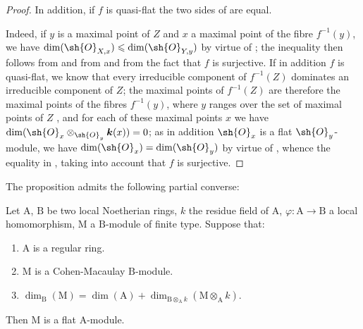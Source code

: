\begin{proof}
In addition, if $f$ is quasi-flat  the two sides of  are equal.

Indeed, if $y$ is a maximal point of $Z$ and $x$ a maximal point of the fibre $f^{-1}(y)$, we have $\dim(\sh{O}_{X,x})\leqslant\dim(\sh{O}_{Y,y})$ by virtue of ; the inequality  then follows from  and from  and from the fact that $f$ is surjective.
If in addition $f$ is quasi-flat, we know  that every irreducible component of $f^{-1}(Z)$ dominates an irreducible component of $Z$; the maximal points of $f^{-1}(Z)$ are therefore the maximal points of the fibres $f^{-1}(y)$, where $y$ ranges over the set of maximal points of $Z$ , and for each of these maximal points $x$ we have $\dim(\sh{O}_x\otimes_{\sh{O}_y}\boldsymbol{k}(x))=0$; as in addition $\sh{O}_x$ is a flat $\sh{O}_y$-module, we have $\dim(\sh{O}_x)=\dim(\sh{O}_y)$ by virtue of , whence the equality in , taking into account that $f$ is surjective.
\end{proof}

The proposition  admits the following partial converse:

\begin{proposition}[6.1.5]
\label{IV.6.1.5}
Let $\mathrm{A}$, $\mathrm{B}$ be two local Noetherian rings, $k$ the residue field of $\mathrm{A}$, $\varphi:\mathrm{A}\to\mathrm{B}$ a local homomorphism, $\mathrm{M}$ a $\mathrm{B}$-module of finite type.
Suppose that:
\begin{enumerate}[label=\upshape\arabic{enumi}\textsuperscript{o}]
  \item $\mathrm{A}$ is a regular ring.
  \item $\mathrm{M}$ is a Cohen-Macaulay $\mathrm{B}$-module.
  \item $\dim_\mathrm{B}(\mathrm{M})=\dim(\mathrm{A})+\dim_{\mathrm{B}\otimes_\mathrm{A} k}(\mathrm{M}\otimes_\mathrm{A} k)$.
\end{enumerate}
Then $\mathrm{M}$ is a flat $\mathrm{A}$-module.
\end{proposition}

